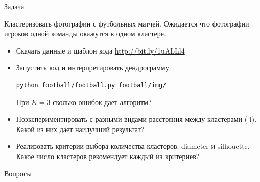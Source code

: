 \documentclass[10pt]{beamer}
\begin{document}
\begin{frame}[fragile]{Задача}

Кластеризовать фотографии с футбольных матчей. Ожидается что фотографии игроков одной команды окажутся в одном кластере.

\begin{itemize}
\item Скачать данные и шаблон кода \url{http://bit.ly/1uALLl4}
\item Запустить код и интерпретировать дендрограмму
\begin{shaded}
{\color{green} \begin{verbatim}
python football/football.py football/img/
\end{verbatim}}
\end{shaded}
При $K=3$ сколько ошибок дает алгоритм?
\item Поэкспериментировать с разными видами расстояния между кластерами (-l). Какой из них дает наилучший результат?
\item Реализовать критерии выбора количества кластеров: diameter и silhouette. Какое число кластеров рекомендует каждый из критериев?
\end{itemize}

\end{frame}

\begin{frame}[plain]
\begin{center}
{\Large Вопросы}
\end{center}
\end{frame}
\end{document}
